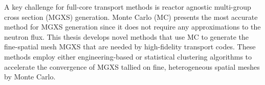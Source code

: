 \begin{abstractpage}

A key challenge for full-core transport methods is reactor agnostic multi-group cross section (MGXS) generation. Monte Carlo (MC) presents the most accurate method for MGXS generation since it does not require any approximations to the neutron flux. This thesis develops novel methods that use MC to generate the fine-spatial mesh MGXS that are needed by high-fidelity transport codes. These methods employ either engineering-based or statistical clustering algorithms to accelerate the convergence of MGXS tallied on fine, heterogeneous spatial meshes by Monte Carlo.







\end{abstractpage}
